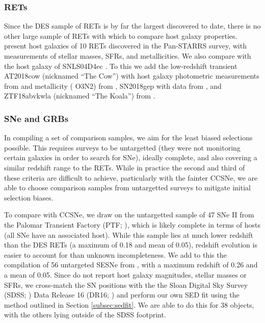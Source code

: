 \documentclass[fleqn,usenatbib,]{mnras}
\begin{document}
\subsubsection{RETs \label{subsubsec:compare_rets}}
Since the DES sample of RETs is by far the largest discovered to date, there is no other large sample of RETs with which to compare host galaxy properties. \citet{Drout2014} present host galaxies of 10 RETs discovered in the Pan-STARRS survey, with measurements of stellar masses, SFRs, and metallicities. We also compare with the host galaxy of SNLS04D4ec \citep{Arcavi2016}. To this we add the low-redshift transient AT2018cow (nicknamed ``The Cow'') with host galaxy photometric measurements from \citet{Perley2019} and metallicity (\citealt{Pettini2004} O3N2) from \citet{Morokuma-Matsui2019}, SN2018gep with data from  \citet{Ho2019}, and ZTF18abvkwla (nicknamed ``The Koala'') from \citet{Ho2020}.

\subsubsection{SNe and GRBs \label{subsubsec:compare_CCSNe}}

In compiling a set of comparison samples, we aim for the least biased selections possible. This requires surveys to be untargetted (they were not monitoring certain galaxies in order to search for SNe), ideally complete, and also covering a similar redshift range to the RETs. While in practice the second and third of these criteria are difficult to achieve, particularly with the fainter CCSNe, we are able to choose comparison samples from untargetted surveys to mitigate initial selection biases.

To compare with CCSNe, we draw on the untargetted sample of 47 SNe II from the Palomar Transient Factory (PTF; \citealt{Stoll2013}), which is likely complete in terms of hosts (all SNe have an associated host). While this sample lies at much lower redshift than the DES RETs (a maximum of 0.18 and mean of 0.05), redshift evolution is easier to account for than unknown incompleteness. We add to this the compilation of 56 untargeted SESNe from \citet{Sanders2012}, with a maximum redshift of 0.26 and a mean of 0.05. Since \citet{Sanders2012} do not report host galaxy magnitudes, stellar masses or SFRs, we cross-match the SN positions with the the Sloan Digital Sky Survey (SDSS; \citealt{York2000}) Data Release 16 (DR16; \citealt{Ahumada2019}) and perform our own SED fit using the method outlined in Section \ref{subsec:sedfit}. We are able to do this for 38 objects, with the others lying outside of the SDSS footprint.
\end{document}
